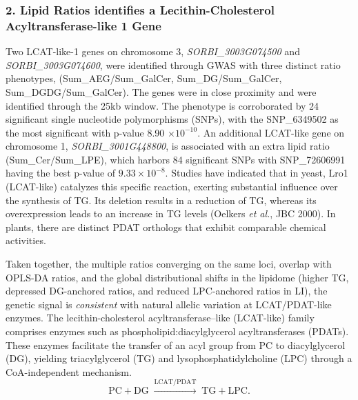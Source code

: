 \documentclass[10pt,letterpaper]{article}
\begin{document}
\begin{itemize}
\subsubsection*{2. Lipid Ratios identifies a Lecithin-Cholesterol Acyltransferase-like 1 Gene}
Two LCAT-like-1 genes on chromosome 3, \textit{SORBI\_3003G074500} and \textit{SORBI\_3003G074600}, were identified through GWAS with three distinct ratio phenotypes, (Sum\_AEG/Sum\_GalCer, Sum\_DG/Sum\_GalCer, Sum\_DGDG/Sum\_GalCer). The genes were in close proximity and were identified through the 25kb window. The phenotype is corroborated by 24 significant single nucleotide polymorphisms (SNPs), with the  SNP\_6349502 as the most significant with p-value 8.90 $\times 10^{-10}$. An additional LCAT-like gene on chromosome 1, \textit{SORBI\_3001G448800}, is associated with an extra lipid ratio (Sum\_Cer/Sum\_LPE), which harbors 84 significant SNPs with SNP\_72606991 having the best p-value of $9.33 \times 10^{-8}$. Studies have indicated that in yeast, Lro1 (LCAT-like) catalyzes this specific reaction, exerting substantial influence over the synthesis of TG. Its deletion results in a reduction of TG, whereas its overexpression leads to an increase in TG levels (Oelkers \textit{et al.}, JBC 2000). In plants, there are distinct PDAT orthologs that exhibit comparable chemical activities. 

Taken together, the multiple ratios converging on the same loci, overlap with OPLS-DA ratios, and the global distributional shifts in the lipidome (higher TG, depressed DG-anchored ratios, and reduced LPC-anchored ratios in LI), the genetic signal is \emph{consistent} with natural allelic variation at LCAT/PDAT-like enzymes. The lecithin-cholesterol acyltransferase–like (LCAT-like) family comprises enzymes such as phospholipid:diacylglycerol acyltransferases (PDATs). These enzymes facilitate the transfer of an acyl group from PC to diacylglycerol (DG), yielding triacylglycerol (TG) and lysophosphatidylcholine (LPC) through a CoA-independent mechanism.
\[
\text{PC} + \text{DG} \;\xrightarrow{\text{LCAT/PDAT}}\; \text{TG} + \text{LPC}.
\]





\end{itemize}
\end{document}
